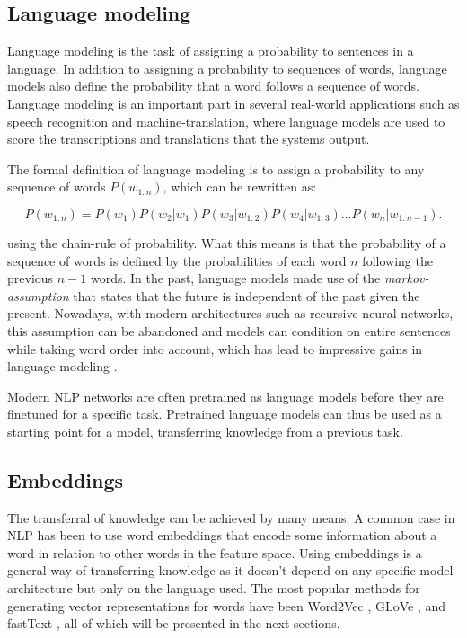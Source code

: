 \subsection{Language modeling}\label{Language modeling}
Language modeling is the task of assigning a probability to sentences in a language.
In addition to assigning a probability to sequences of words, language models also define the probability that a word follows a sequence of words.
Language modeling is an important part in several real-world applications such as speech recognition and machine-translation, where language models are used to score the transcriptions and translations that the systems output.

The formal definition of language modeling is to assign a probability to any sequence of words $P(w_{1:n})$, which can be rewritten as:

\begin{equation}
  P(w_{1:n})=P(w_1)P(w_2|w_1)P(w_3|w_{1:2})P(w_4|w_{1:3})\ldots{}P(w_n|w_{1:n-1}).
\end{equation}

using the chain-rule of probability.
What this means is that the probability of a sequence of words is defined by the probabilities of each word $n$ following the previous $n-1$ words.
In the past, language models made use of the \textit{markov-assumption} that states that the future is independent of the past given the present.
Nowadays, with modern architectures such as recursive neural networks, this assumption can be abandoned and models can condition on entire sentences while taking word order into account, which has lead to impressive gains in language modeling \cite{goldberg2017}.

Modern NLP networks are often pretrained as language models before they are finetuned for a specific task.
Pretrained language models can thus be used as a starting point for a model, transferring knowledge from a previous task.

\subsection{Embeddings} \label{Embeddings}
The transferral of knowledge can be achieved by many means.
A common case in NLP has been to use word embeddings that encode some information about a word in relation to other words in the feature space.
Using embeddings is a general way of transferring knowledge as it doesn't depend on any specific model architecture but only on the language used.
The most popular methods for generating vector representations for words have been Word2Vec \cite{mikolov2013}, GLoVe \cite{pennington2014}, and fastText \cite{bojanowski2017}, all of which will be presented in the next sections.

